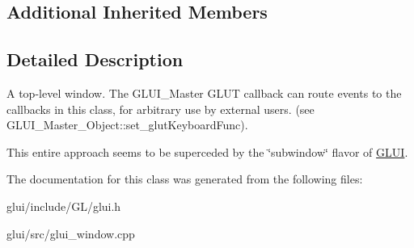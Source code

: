 \subsection*{Additional Inherited Members}


\subsection{Detailed Description}
A top-\/level window. The G\-L\-U\-I\-\_\-\-Master G\-L\-U\-T callback can route events to the callbacks in this class, for arbitrary use by external users. (see G\-L\-U\-I\-\_\-\-Master\-\_\-\-Object\-::set\-\_\-glut\-Keyboard\-Func).

This entire approach seems to be superceded by the \char`\"{}subwindow\char`\"{} flavor of \hyperlink{classGLUI}{G\-L\-U\-I}. 

The documentation for this class was generated from the following files\-:\begin{DoxyCompactItemize}
\item 
glui/include/\-G\-L/glui.\-h\item 
glui/src/glui\-\_\-window.\-cpp\end{DoxyCompactItemize}
